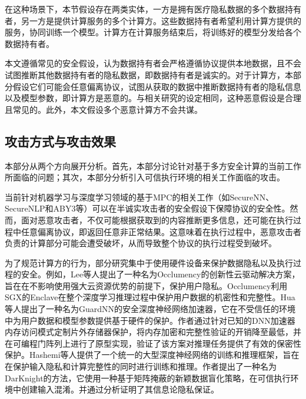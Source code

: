 %

在这种场景下，本节假设存在两类实体，一方是拥有医疗隐私数据的多个数据持有者，另一方是提供计算服务的多个计算方。这些数据持有者希望利用计算方提供的服务，协同训练一个模型。计算方在计算服务结束后，将训练好的模型分发给各个数据持有者。

本文遵循常见的安全假设\cite{SecureNN, SecureNLP}，认为数据持有者会严格遵循协议提供本地数据，且不会试图推断其他数据持有者的隐私数据，即数据持有者是诚实的。对于计算方，本部分假设它们可能会任意偏离协议，试图从获取的数据中推断数据持有者的隐私信息以及模型参数，即计算方是恶意的。与相关研究\cite{Cryptflow}的设定相同，这种恶意假设是合理且常见的。此外，本文假设多个恶意计算方不会共谋。

\subsection{攻击方式与攻击效果}

本部分从两个方向展开分析。首先，本部分讨论针对基于多方安全计算的当前工作所面临的问题；其次，本部分分析引入可信执行环境的相关工作面临的攻击。

当前针对机器学习与深度学习领域的基于MPC的相关工作（如SecureNN\cite{SecureNN}、SecureNLP\cite{SecureNLP}和ABY3\cite{aby3}等）可以在半诚实攻击者的安全假设下保障协议的安全性。然而，面对恶意攻击者，不仅可能根据获取到的内容推断更多信息，还可能在执行过程中任意偏离协议，即返回任意非正常结果\cite{Cryptflow}。这意味着在执行过程中，恶意攻击者负责的计算部分可能会遭受破坏，从而导致整个协议的执行过程受到破坏。

为了规范计算方的行为，部分研究集中于使用硬件设备来保护数据隐私以及执行过程的安全。例如，Lee等人\cite{lee2019occlumency}提出了一种名为Occlumency的创新性云驱动解决方案，旨在在不影响使用强大云资源优势的前提下，保护用户隐私。Occlumency利用SGX的Enclave在整个深度学习推理过程中保护用户数据的机密性和完整性。Hua等人\cite{hua2020guardnn}提出了一种名为GuardNN的安全深度神经网络加速器，它在不受信任的环境中为用户数据和模型参数提供基于硬件的保护。作者通过针对已知的DNN加速器内存访问模式定制片外存储器保护，将内存加密和完整性验证的开销降至最低，并在可编程门阵列上进行了原型实现，验证了该方案对推理任务提供了有效的保密性保护。Hashemi等人\cite{hashemi2020darknight}提供了一个统一的大型深度神经网络的训练和推理框架，旨在在保护输入隐私和计算完整性的同时进行训练和推理。作者提出了一种名为DarKnight的方法，它使用一种基于矩阵掩蔽的新颖数据盲化策略，在可信执行环境中创建输入混淆。并通过分析证明了其信息论隐私保证。

